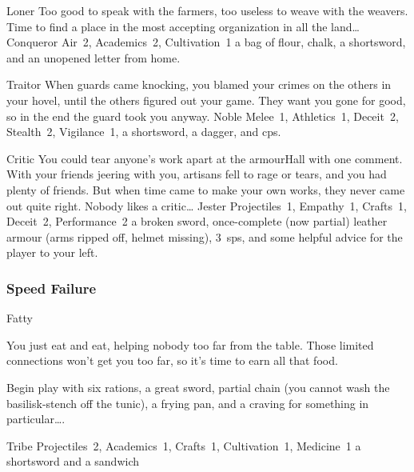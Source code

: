 \begin{multicols}{2}
\begin{itemize}
    {Loner}%
    {Too good to speak with the farmers, too useless to weave with the weavers.
      Time to find a place in the most accepting organization in all the land\ldots}%
    {Conqueror}%
    {
      Air~2, Academics~2, Cultivation~1
    }%
    {a bag of flour, chalk, a shortsword, and an unopened letter from home.}%

    {Traitor}%
    {
      When guards came knocking, you blamed your crimes on the others in your hovel, until the others figured out your game.
      They want you gone for good, so in the end the \gls{guard} took you anyway.
    }%
    {Noble}%
    {
      Melee~1, Athletics~1, Deceit~2, Stealth~2, Vigilance~1,
    }%
    {a shortsword, a dagger, and  \glspl{cp}.}%

    {Critic}%
    {
      You could tear anyone's work apart at the \gls{armourHall} with one comment.
      With your friends jeering with you, artisans fell to rage or tears, and you had plenty of friends.
      But when time came to make your own works, they never came out quite right.
      Nobody likes a critic\ldots
    }%
    {Jester}%
    {
      Projectiles~1, Empathy~1, Crafts~1, Deceit~2, Performance~2
    }%
    {a broken sword, once-complete (now partial) leather armour (arms ripped off, helmet missing), 3~\glspl{sp}, and some helpful advice for the player to your left.}%

\end{itemize}

\needspace{16em}
\subsubsection{Speed Failure}

\begin{itemize}

    {Fatty}%
    {
      You just eat and eat, helping nobody too far from the table.
      Those limited connections won't get you too far, so it's time to earn all that food.

      Begin play with six rations, a great sword, partial chain (you cannot wash the \gls{basilisk}-stench off the tunic), a frying pan, and a craving for something in particular\ldots.
    }%
    {Tribe}%
    {Projectiles~2, Academics~1, Crafts~1, Cultivation~1, Medicine~1}%
    {a shortsword and a sandwich}%


\end{itemize}
\end{multicols}
